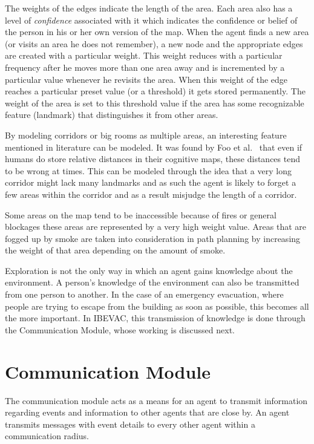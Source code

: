 The weights of the edges indicate the length of the area. Each area also has a level of \emph{confidence} associated with it which indicates the confidence or belief of the person in his or her own version of the map. When the agent finds a new area (or visits an area he does not remember), a new node and the appropriate edges are created with a particular weight. This weight reduces with a particular frequency after he moves more than one area away and is incremented by a particular value whenever he revisits the area. When this weight of the edge reaches a particular preset value (or a threshold) it gets stored permanently. The weight of the area is set to this threshold value if the area has some recognizable feature (landmark) that distinguishes it from other areas.

By modeling corridors or big rooms as multiple areas, an interesting feature mentioned in literature can be modeled. It was found by Foo et al.~\cite{Foo:2005kw} that even if humans do store relative distances in their cognitive maps, these distances tend to be wrong at times. This can be modeled through the idea that a very long corridor might lack many landmarks and as such the agent is likely to forget a few areas within the corridor and as a result misjudge the length of a corridor.

Some areas on the map tend to be inaccessible because of fires or general blockages these areas are represented by a very high weight value. Areas that are fogged up by smoke are taken into consideration in path planning by increasing the weight of that area depending on the amount of smoke.

Exploration is not the only way in which an agent gains knowledge about the environment. A person's knowledge of the environment can also be transmitted from one person to another. In the case of an emergency evacuation, where people are trying to escape from the building as soon as possible, this becomes all the more important. In IBEVAC, this transmission of knowledge is done through the Communication Module, whose working is discussed next.

\section{Communication Module}
\label{CFW:CommunicationModule}
The communication module acts as a means for an agent to transmit information regarding events and information to other agents that are close by. An agent transmits messages with event details to every other agent within a communication radius.

